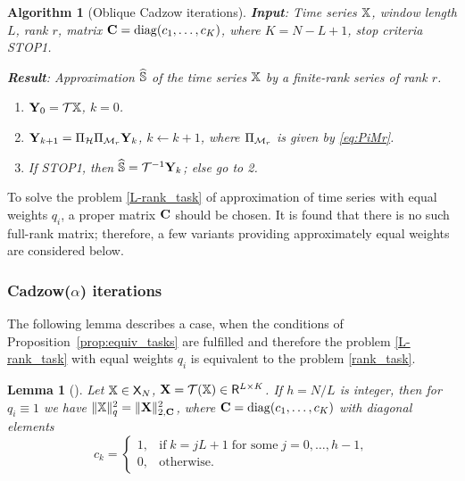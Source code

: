 \documentclass[sii]{ipart}
\newtheorem{algorithm}{Algorithm}
\newtheorem{lemma}{Lemma}
\begin{document}
\begin{algorithm}[Oblique Cadzow iterations]
	\label{alg:obliqueCadzow}
	\textbf{Input}: Time series $\mathbb{X}$, window length $L$, rank $r$, matrix $\mathbf{C}=\mathop{\mathrm{diag}}(c_1,\ldots, c_K)$, where $K=N-L+1$,
	stop criteria STOP1.
	
	\textbf{Result}:
	Approximation $\widehat{\mathbb{S}}$ of the time series $\mathbb{X}$ by a finite-rank series of rank $r$.
	
	\begin{enumerate}
		\item
		$\mathbf{Y}_0 = \mathcal{T} \mathbb{X}$, $k=0$.
		\item
		$\mathbf{Y}_{k+1} = \Pi_{\mathcal{H}}  \Pi_{\mathcal{M}_r} \mathbf{Y}_{k}$, $k\leftarrow k+1$, where
		$\Pi_{\mathcal{M}_r}$ is given by \eqref{eq:PiMr}.
		\item
		If STOP1, then $\widehat{\mathbb{S}} = \mathcal{T}^{-1} \mathbf{Y}_k$; else go to 2.
	\end{enumerate}
\end{algorithm}

To solve the problem \eqref{L-rank_task} of approximation of time series with equal weights $q_i$, a proper matrix $\mathbf{C}$ should be chosen. It is found that there is no such full-rank matrix; therefore, a few variants providing approximately equal weights are considered below.

\subsubsection{Cadzow($\alpha$) iterations}
\label{sec:cadzow_alpha}
The following lemma describes a case, when the conditions of Proposition~\ref{prop:equiv_tasks} are fulfilled and therefore
the problem \eqref{L-rank_task} with equal weights $q_i$ is equivalent to the problem \eqref{rank_task}.

\begin{lemma}[\cite{Gillard2014}]
	\label{zhiglemma}
	Let $\mathbb{X} \in \mathsf{X}_N$, $\mathbf{X} = \mathcal{T}(\mathbb{X}) \in \mathsf{R}^{L \times K}$. If $h = N/L$ is integer, then for $q_i\equiv 1$ we have $\|\mathbb{X}\|^2_q = \|\mathbf{X}\|^2_{2, \mathbf{C}}$, where $\mathbf{C}=\mathop{\mathrm{diag}}(c_1,\ldots,c_K)$ with diagonal elements
	\begin{equation*}
	c_k = \begin{cases}
	1, & \text{if} \; k = jL+1 \;\text{for some} \; j = 0, \ldots, h-1, \\
	0, & \text{otherwise}.
	\end{cases}
	\end{equation*}
\end{lemma}
\end{document}
